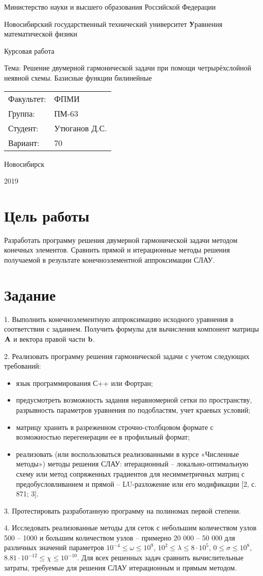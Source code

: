 \documentclass[12pt, a4paper]{article}
\newcommand{\insertTitle}[5]{
\begin{titlepage}
	\begin{center}
    	\large
		Министерство науки и высшего образования Российской Федерации
		
		Новосибирский государственный технический университет
		\vfill
		{\textbf #1}
		
		Курсовая работа
		
		Тема: Решение двумерной гармонической задачи при помощи четрырёхслойной неявной схемы. Базисные функции билинейные
		\vfill
	\end{center}
	
	\begin{tabular}{ m{7em}  m{7em} }
	Факультет: & ФПМИ \\ 
	Группа: & #2 \\  
	Студент: & #3 \\
	Вариант: & #4
	\end{tabular}
	\vfill

\begin{center}
Новосибирск

#5
\end{center}
\end{titlepage}
}
\begin{document}
\setlength{\abovedisplayskip}{1pt}
\setlength{\belowdisplayskip}{1pt}

\insertTitle{Уравнения математической физики}{ПМ-63}{Утюганов Д.С.}{70}{2019}


\section{Цель работы}
Разработать программу решения двумерной гармонической задачи методом конечных элементов. Сравнить прямой и итерационные методы решения получаемой в результате конечноэлементной аппроксимации СЛАУ.


\section{Задание}

1.	Выполнить конечноэлементную аппроксимацию исходного уравнения в соответствии с заданием. Получить формулы для вычисления компонент матрицы ${\bf A}$ и вектора правой части ${\bf b}$. 

2.	Реализовать программу решения гармонической задачи с учетом следующих требований:
\begin{itemize}[noitemsep]
\item язык программирования С++ или Фортран;
\item предусмотреть возможность задания неравномерной сетки по пространству, разрывность параметров уравнения по подобластям, учет краевых условий;
\item матрицу хранить в разреженном строчно-столбцовом формате с возможностью перегенерации ее в профильный формат; 
\item реализовать (или воспользоваться реализованными в курсе «Численные методы») методы решения СЛАУ: итерационный – локально-оптимальную схему или метод сопряженных градиентов для несимметричных матриц с предобусловливанием и прямой – LU-разложение или его модификации [2, с. 871; 3].
\end{itemize}

3.	Протестировать разработанную программу на полиномах первой степени.

4.	Исследовать реализованные методы для сеток с небольшим количеством узлов 500 – 1000 и большим количеством узлов – примерно 20 000 – 50 000 для различных значений параметров $ 10^{-4} \leq \omega \leq 10^{9} $, $ 10^{2} \leq \lambda \leq 8\cdot10^{5} $, $ 0 \leq \sigma \leq 10^{8} $, $ 8.81 \cdot 10^{-12} \leq \chi \leq 10^{-10} $. Для всех решенных задач сравнить вычислительные затраты, требуемые для решения СЛАУ итерационным и прямым методом.
\end{document}
